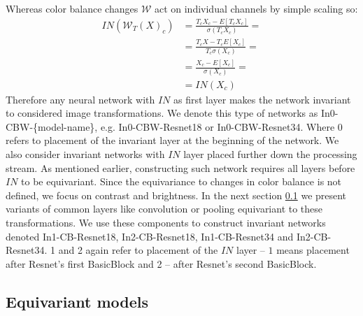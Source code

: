 Whereas color balance changes $\mathcal{W}$ act on individual channels by simple
scaling so:
\begin{align*}
    \textit{IN}(\mathcal{W}_T(X)_c) &=
    \frac{T_cX_c - E\left[T_cX_c\right]}{\sigma(T_cX_c)} = \\
    &= \frac{T_cX-T_cE[X_c]}{T_c\sigma(X_c)} = \\
    &= \frac{X_c-E[X_c]}{\sigma(X_c)} = \\
    &= \textit{IN}(X_c)
\end{align*}
Therefore any neural network with $\textit{IN}$ as first layer
makes the network invariant to considered image transformations.
We denote this type of networks as In0-CBW-\{model-name\}, e.g. In0-CBW-Resnet18 or
In0-CBW-Resnet34. Where 0 refers to placement of the invariant layer at the
beginning of the network. We also consider invariant networks with $\textit{IN}$
layer placed further down the processing stream. As mentioned earlier,
constructing such network requires all layers before $\textit{IN}$ to be
equivariant. Since the equivariance to changes in color balance is not defined,
we focus on contrast and brightness. In the next section \ref{sec:equ_models} we
present variants of common layers like convolution or pooling equivariant to
these transformations. We use these components to construct invariant networks
denoted In1-CB-Resnet18, In2-CB-Resnet18, In1-CB-Resnet34 and In2-CB-Resnet34. 1 and 2
again refer to placement of the $\textit{IN}$ layer -- $1$ means placement
after Resnet's first BasicBlock and 2 -- after Resnet's second
BasicBlock.

\subsection{Equivariant models}
\label{sec:equ_models}

